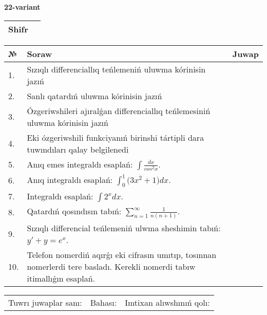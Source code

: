 \documentclass{article}
\begin{document}
  \egroup
  
  \newpage
  
  
  \textbf{22-variant}\\
  
  \bgroup
  \def\arraystretch{1.6} %
  
  \begin{tabular}{|m{5.7cm}|m{9.5cm}|}
  \hline
  Shifr & \\
  \hline
  \end{tabular}
  
  \vspace{1cm}
  
  \begin{tabular}{|m{0.7cm}|m{10cm}|m{4cm}|}
  \hline
  № & Soraw & Juwap \\
  \hline
  1. & Sızıqlı differenciallıq teńlemeniń uluwma kórinisin jazıń &  \\
  \hline
  2. & Sanlı qatardıń uluwma kórinisin jazıń &  \\
  \hline
  3. & Ózgeriwshileri ajıralǵan differenciallıq teńlemesiniń uluwma kórinisin jazıń &  \\
  \hline
  4. & Eki ózgeriwshili funkciyanıń birinshi tártipli dara tuwındıları qalay belgilenedi &  \\
  \hline
  5. & Anıq emes integraldı esaplań: \(\int\frac{dx}{cos^2 x}\). &  \\
  \hline
  6. & Anıq integraldı esaplań: \(\int_{0}^{1}{(3x^2 } + 1)dx\). &  \\
  \hline
  7. & Integraldı esaplań: \(\int{2^{x}dx}\). &  \\
  \hline
  8. & Qatardıń qosındısın tabıń: \(\sum_{n = 1}^{\infty}\frac{1}{n(n + 1)}\). &  \\
  \hline
  9. & Sızıqlı differencial teńlemeniń ulwma sheshimin tabıń: \(y' + y = e^{x}\). &  \\
  \hline
  10. & Telefon nomerdiń aqırǵı eki cifrasın umıtıp, tosınnan nomerlerdi tere basladı. Kerekli nomerdi tabıw itimallıǵın esaplań. &  \\
  \hline
  \end{tabular}
  
  \vspace{1cm}
  
  \begin{tabular}{lll}
  Tuwrı juwaplar sanı: \underline{\hspace{1.5cm}} & 
  Bahası: \underline{\hspace{1.5cm}} & 
  Imtixan alıwshınıń qolı: \underline{\hspace{2cm}} \\
  \end{tabular}
  
\end{document}
